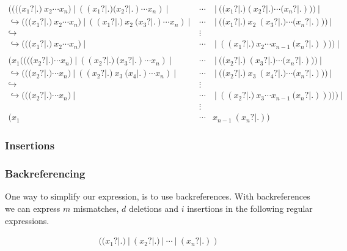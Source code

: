 \documentclass[12pt]{article}
\newcounter{subsubsubsection}[subsubsection]
\begin{document}
\begin{eqnarray}
	((((x_1?|.) \ x_2 \cdots x_n) \ | \ ((x_1?|.)(x_2?|.) \cdots x_n) \ | \ & \cdots & \ | \ ((x_1?|.)(x_2?|.) \cdots (x_n?|.))) \ | \\
	\hookrightarrow (((x_1?|.) \ x_2 \cdots x_n) \ | \ ((x_1?|.) \ x_2 \ (x_3?|.) \cdots x_n) \ | \ & \cdots & \ | \ ((x_1?|.) \ x_2 \ (x_3?|.) \cdots (x_n?|.))) \ | \nonumber \\
 	\hookrightarrow & \vdots & \nonumber \\
 	\hookrightarrow (((x_1?|.) \ x_2 \cdots x_n) \ | \ & \cdots & \ | \ ((x_1?|.) \ x_2 \cdots x_{n-1} \ (x_n?|.)))) \ | \nonumber \\
 	\nonumber \\
 	(x_1((((x_2?|.) \cdots x_n) \ | \ ((x_2?|.) \ (x_3?|.) \cdots x_n) \ | \ & \cdots & \ | \ ((x_2?|.) \ (x_3?|.) \cdots (x_n?|.))) \ | \\
	\hookrightarrow (((x_2?|.) \cdots x_n) \ | \ ((x_2?|.) \ x_3 \ (x_4|.) \cdots x_n) \ | \ & \cdots & \ | \ ((x_2?|.) \ x_3 \ (x_4?|.) \cdots (x_n?|.))) \ | \nonumber \\
 	\hookrightarrow & \vdots & \nonumber \\
 	\hookrightarrow (((x_2?|.) \cdots x_n) \ | \ & \cdots & \ | \ ((x_2?|.) \ x_3 \cdots x_{n-1} \ (x_n?|.))))) \ | \nonumber \\
 	& \vdots & \nonumber \\
 	(x_1 & \cdots & x_{n-1} \ (x_{n}?|.))
\end{eqnarray}

\subsubsection{Insertions}



\subsubsection{Backreferencing}

One way to simplify our expression, is to use backreferences. With backreferences we can express $m$ mismatches, $d$ deletions and $i$ insertions in the following regular expressions.


\begin{eqnarray}
	((x_1?|.) \ | \ (x_2?|.) \ | \ \cdots \ | \ (x_n?|.))
\end{eqnarray}



\newpage


\nocite{*}

\end{document}
